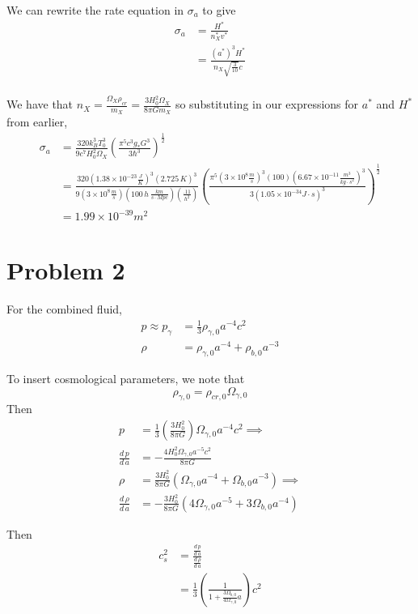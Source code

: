 \documentclass{article}
\newcommand{\tot}[2]{\frac{d\,#1}{d\,#2}}
\begin{document}
We can rewrite the rate equation in $\sigma_a$ to give
\begin{align*}
\sigma_a &= \frac{H^*}{n^*_X v^*}\\
&= \frac{(a^*)^3 H^*}{n_X \sqrt{\frac{3}{10}}c}\\
\end{align*}

We have that $n_X = \frac{\Omega_X \rho_{cr}}{m_X} = \frac{3 H_0^2 \Omega_X}{8\pi G m_X}$ so substituting in our expressions for $a^*$ and $H^*$ from earlier,
\begin{align*}
\sigma_a &= \frac{320 k_B^3 T_0^3}{9c^7 H_0^2 \Omega_X}\left(\frac{\pi^5 c^3 g_* G^3}{3\hbar^3}\right)^{\frac{1}{2}}\\
&= \frac{320(1.38\times 10^{-23}\frac{J}{K})^3(2.725\,K)^3}{9(3\times 10^8 \frac{m}{s})(100\,h\,\frac{km}{s\cdot Mpc})(\frac{.11}{h^2})}\left(\frac{\pi^5 (3\times 10^8\frac{m}{s})^3(100)(6.67\times 10^{-11}\frac{m^3}{kg\cdot s^2})^3}{3(1.05\times 10^{-34}J\cdot s)^3}\right)^{\frac{1}{2}}\\
&=1.99\times 10^{-39}m^2
\end{align*}

\section*{Problem 2}
For the combined fluid, 
\begin{align*}
p \approx p_\gamma &= \frac{1}{3}\rho_{\gamma,0}a^{-4}c^2\\
\rho &= \rho_{\gamma, 0}a^{-4}+\rho_{b,0}a^{-3}
\end{align*}

To insert cosmological parameters, we note that
\[
\rho_{\gamma,0} = \rho_{cr,0}\Omega_{\gamma,0}
\]
Then
\begin{align*}
p &= \frac{1}{3}\left(\frac{3H_0^2}{8\pi G}\right)\Omega_{\gamma,0}a^{-4}c^2\implies\\
\tot{p}{a} &= -\frac{4H_0^2\Omega_{\gamma,0}a^{-5}c^2}{8\pi G}\\
\rho &= \frac{3 H_0^2}{8\pi G}\left(\Omega_{\gamma,0}a^{-4}+\Omega_{b,0}a^{-3}\right)\implies\\
\tot{\rho}{a} &= -\frac{3H_0^2}{8\pi G}(4\Omega_{\gamma,0}a^{-5}+3\Omega_{b,0}a^{-4})
\end{align*}

Then
\begin{align*}
c_s^2 &= \frac{\tot{p}{a}}{\tot{\rho}{a}}\\
&= \frac{1}{3}\left(\frac{1}{1+\frac{3\Omega_{b,0}}{4\Omega_{\gamma,0}}a}\right)c^2
\end{align*}
\end{document}
